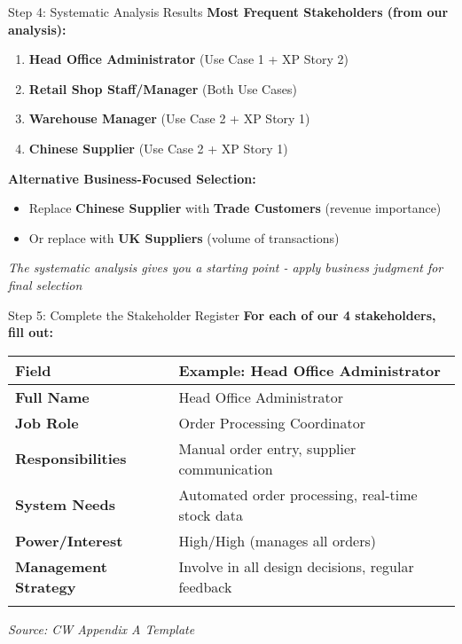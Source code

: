 \documentclass[
  ignorenonframetext,
]{beamer}
\providecommand{\tightlist}{%
  \setlength{\itemsep}{0pt}\setlength{\parskip}{0pt}}
\begin{document}
\begin{frame}{Step 4: Systematic Analysis Results}
\label{step-4-systematic-analysis-results}
\textbf{Most Frequent Stakeholders (from our analysis):}

\begin{enumerate}
\tightlist
\item
  \textbf{Head Office Administrator} (Use Case 1 + XP Story 2)
\item
  \textbf{Retail Shop Staff/Manager} (Both Use Cases)\\
\item
  \textbf{Warehouse Manager} (Use Case 2 + XP Story 1)
\item
  \textbf{Chinese Supplier} (Use Case 2 + XP Story 1)
\end{enumerate}

\textbf{Alternative Business-Focused Selection:}

\begin{itemize}
\tightlist
\item
  Replace \textbf{Chinese Supplier} with \textbf{Trade Customers}
  (revenue importance)
\item
  Or replace with \textbf{UK Suppliers} (volume of transactions)
\end{itemize}

\emph{The systematic analysis gives you a starting point - apply
business judgment for final selection}
\end{frame}

\begin{frame}{Step 5: Complete the Stakeholder Register}
\label{step-5-complete-the-stakeholder-register}
\textbf{For each of our 4 stakeholders, fill out:}

\begin{longtable}[]{@{}
  >{\raggedright\arraybackslash}p{}
  >{\raggedright\arraybackslash}p{}@{}}
\toprule\noalign{}
\begin{minipage}[b]{\linewidth}\raggedright
Field
\end{minipage} & \begin{minipage}[b]{\linewidth}\raggedright
Example: Head Office Administrator
\end{minipage} \\
\midrule\noalign{}
\endhead
\textbf{Full Name} & Head Office Administrator \\
\textbf{Job Role} & Order Processing Coordinator \\
\textbf{Responsibilities} & Manual order entry, supplier
communication \\
\textbf{System Needs} & Automated order processing, real-time stock
data \\
\textbf{Power/Interest} & High/High (manages all orders) \\
\textbf{Management Strategy} & Involve in all design decisions, regular
feedback \\
\bottomrule\noalign{}
\end{longtable}

\emph{Source: CW Appendix A Template}
\end{frame}
\end{document}
